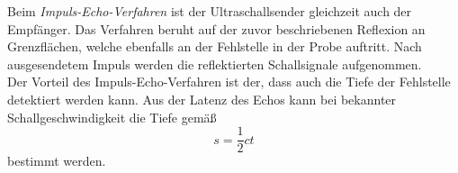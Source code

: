 Beim \textit{Impuls-Echo-Verfahren} ist der Ultraschallsender gleichzeit auch der Empfänger. Das Verfahren
beruht auf der zuvor beschriebenen Reflexion an Grenzflächen, welche ebenfalls an der Fehlstelle in
der Probe auftritt. Nach ausgesendetem Impuls werden die reflektierten Schallsignale aufgenommen.
\\
Der Vorteil des Impuls-Echo-Verfahren ist der, dass auch die Tiefe der Fehlstelle detektiert
werden kann. Aus der Latenz des Echos kann bei bekannter Schallgeschwindigkeit die Tiefe gemäß
\begin{equation}
	\label{eqn:tiefe_fehlstelle}
	s = \frac12 ct
\end{equation}
bestimmt werden.

